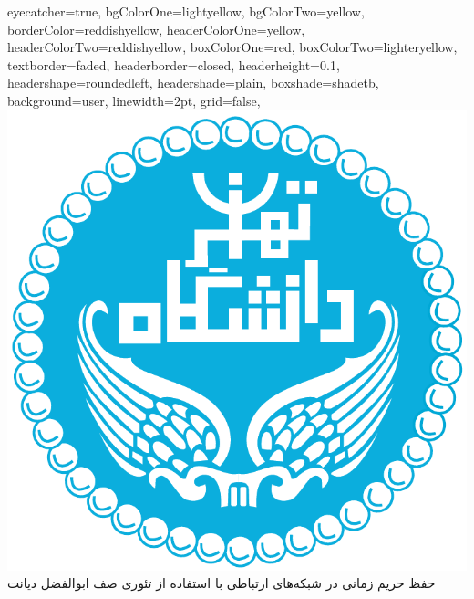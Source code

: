 \documentclass[debug,a0paper,portrait,persian]{xebaposter}
\begin{document}
      \begin{poster}%
      {
      eyecatcher=true,
      bgColorOne=lightyellow,
      bgColorTwo=yellow,
      borderColor=reddishyellow,
      headerColorOne=yellow,
      headerColorTwo=reddishyellow,
      boxColorOne=red,
      boxColorTwo=lighteryellow,
      textborder=faded,
      headerborder=closed,
      headerheight=0.1\textheight,
      headershape=roundedleft,
      headershade=plain,
      boxshade=shadetb,%
      background=user,%
      linewidth=2pt,
      grid=false,
      }
 {
      \includegraphics[height=0.07\textheight]{utlogo}
 }
 {حفظ حریم زمانی  در شبکه‌های ارتباطی با استفاده از تئوری صف 
}
 {\large ابوالفضل دیانت 
 \\%
 {\normalsize\texttt{}}}
 {
\begin{tabular}{r}
\end{tabular}
 }



\end{poster}
\end{document}
